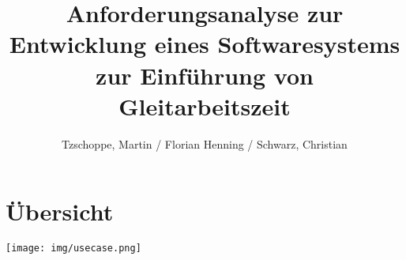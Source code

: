 \documentclass{article}
\title{Anforderungsanalyse zur Entwicklung eines Softwaresystems zur Einführung
von Gleitarbeitszeit}
\author{Tzschoppe, Martin / Florian Henning / Schwarz, Christian}
\begin{document}
\maketitle
\newpage
\tableofcontents
\newpage

\section{Übersicht}
\begin{turn}{-90}

\texttt{[image: img/usecase.png]}

\end{turn}
\end{document}
